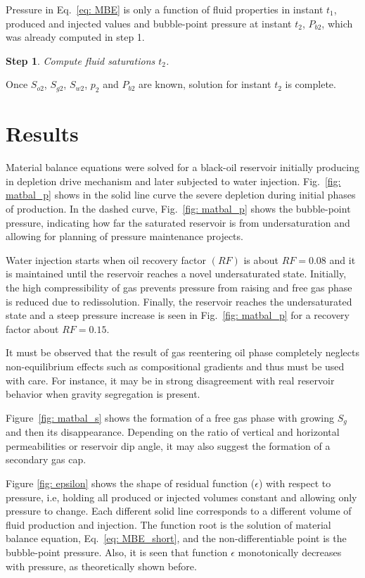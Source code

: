 \documentclass[authoryear,preprint,review,12pt]{elsarticle}
\newtheorem{step}{Step}
\begin{document}
Pressure in Eq.~\eqref{eq: MBE} is only a function of fluid properties in instant $t_1$, produced and injected values and bubble-point pressure at instant $t_2$, $P_{b2}$, which was already computed in step 1.

\begin{step}
Compute fluid saturations $t_2$.
\end{step}

Once $S_{o2}$, $S_{g2}$, $S_{w2}$, $p_2$ and $P_{b2}$ are known, solution for instant $t_2$ is complete.

\section{Results}
Material balance equations were solved for a black-oil reservoir initially producing in depletion drive mechanism and later subjected to water injection. Fig.~\ref{fig: matbal_p} shows in the solid line curve the severe depletion during initial phases of production. In the dashed curve, Fig.~\ref{fig: matbal_p} shows the bubble-point pressure, indicating how far the saturated reservoir is from undersaturation and allowing for planning of pressure maintenance projects.


Water injection starts when oil recovery factor $(RF)$ is about $RF=0.08$ and it is maintained until the reservoir reaches a novel undersaturated state. Initially, the high compressibility of gas prevents pressure from raising and free gas phase is reduced due to redissolution. Finally, the reservoir reaches the undersaturated state and a steep pressure increase is seen in Fig.~\ref{fig: matbal_p} for a recovery factor about $RF=0.15$.

It must be observed that the result of gas reentering oil phase completely neglects non-equilibrium effects such as compositional gradients and thus must be used with care. For instance, it may be in strong disagreement with real reservoir behavior when gravity segregation is present.

Figure~\ref{fig: matbal_s} shows the formation of a free gas phase with growing $S_g$ and then its disappearance. Depending on the ratio of vertical and horizontal permeabilities or reservoir dip angle, it may also suggest the formation of a secondary gas cap.

Figure \ref{fig: epsilon} shows the shape of residual function ($\epsilon$) with respect to pressure, i.e, holding all produced or injected volumes constant and allowing only pressure to change. Each different solid line corresponds to a different volume of fluid production and injection. The function root is the solution of material balance equation, Eq.~\eqref{eq: MBE_short}, and the non-differentiable point is the bubble-point pressure. Also, it is seen that function $\epsilon$ monotonically decreases with pressure, as theoretically shown before.
\end{document}
